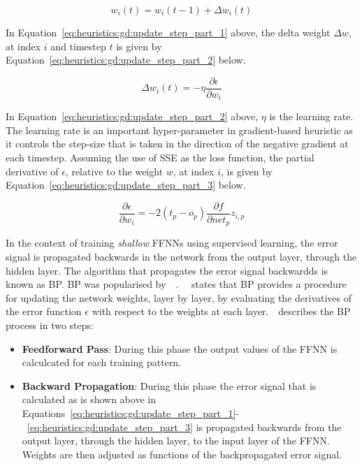\begin{equation}
      \label{eq:heuristics:gd:update_step_part_1}
      w_{i}(t) = w_{i}(t-1) + \Delta w_{i}(t)
\end{equation}

\noindent
In Equation~\eqref{eq:heuristics:gd:update_step_part_1} above, the delta weight $\Delta w$, at index $i$ and timestep $t$ is given by Equation~\eqref{eq:heuristics:gd:update_step_part_2} below.

\begin{equation}
      \label{eq:heuristics:gd:update_step_part_2}
      \Delta w_{i}(t) = -\eta\frac{\partial \epsilon}{\partial w_{i}}
\end{equation}

\noindent
In Equation~\eqref{eq:heuristics:gd:update_step_part_2} above, $\eta$ is the learning rate. The learning rate is an important hyper-parameter in gradient-based heuristic as it controls the step-size that is taken in the direction of the negative gradient at each timestep. Assuming the use of \acs{SSE} as the loss function, the partial derivative of $\epsilon$, relative to the weight $w$, at index $i$, is given by Equation~\eqref{eq:heuristics:gd:update_step_part_3} below.

\begin{equation}
      \label{eq:heuristics:gd:update_step_part_3}
      \frac{\partial \epsilon}{\partial w_{i}} = -2(t_{p} - o_{p})\frac{\partial f}{\partial net_{p}}z_{i,p}
\end{equation}

\noindent
In the context of training \textit{shallow} \acp{FFNN} using supervised learning, the error signal is propagated backwards in the network from the output layer, through the hidden layer. The algorithm that propagates the error signal backwardds is known as \acf{BP}. \Acs{BP} was popularised by~\citeauthor{ref:werbos:1994}~\cite{ref:werbos:1994}.~\citeauthor{ref:nel:2021}~\cite{ref:nel:2021} states that \acs{BP} provides a procedure for updating the network weights, layer by layer, by evaluating the derivatives of the error function $\epsilon$ with respect to the weights at each layer.~\citeauthor{ref:engelbrecht:2007}~\cite{ref:engelbrecht:2007}describes the \acs{BP} process in two steps:

\begin{itemize}
      \item \textbf{Feedforward Pass}: During this phase the output values of the \acs{FFNN} is calculcated for each training pattern.
      \item \textbf{Backward Propagation}: During this phase the error signal that is calculated as is shown above in Equations~\eqref{eq:heuristics:gd:update_step_part_1}-~\eqref{eq:heuristics:gd:update_step_part_3} is propagated backwards from the output layer, through the hidden layer, to the input layer of the \acs{FFNN}. Weights are then adjusted as functions of the backpropagated error signal.
\end{itemize}


